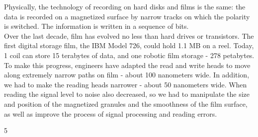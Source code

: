 \documentclass[a4paper,14pt]{extreport}
\begin{document}
Physically, the technology of recording on hard disks and films is the same: the data is recorded on a magnetized surface by narrow tracks on which the polarity is switched. The information is written in a sequence of bits. \\
  Over the last decade, film has evolved no less than hard drives or transistors. The first digital storage film, the IBM Model 726, could hold 1.1 MB on a reel. Today, 1 coil can store 15 terabytes of data, and one robotic film storage - 278 petabytes. \\

  To make this progress, engineers have adapted the read and write heads to move along extremely narrow paths on film - about 100 nanometers wide. In addition, we had to make the reading heads narrower - about 50 nanometers wide. When reading the signal level to noise also decreased, so we had to manipulate the size and position of the magnetized granules and the smoothness of the film surface, as well as improve the process of signal processing and reading errors. \par
  \noindent{\color{blue} \rule{\linewidth}{0.7mm}}
  \begin{center}5\end{center}
  \noindent{\color{blue} \rule{\linewidth}{0.7mm}}
\end{document}
